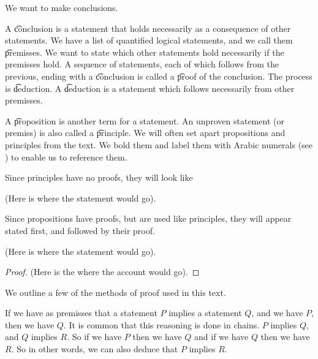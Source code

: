 

We want to make conclusions.


A \t{conclusion} is a statement that holds necessarily as a consequence of other statements.
We have a list of quantified logical statements, and we call them \t{premisses}.
We want to state which other statements hold necessarily if the premisses hold.
A sequence of statements, each of which follows from the previous, ending with a \t{conclusion} is called a \t{proof} of the conclusion.
The process is \t{deduction}.
A \t{deduction} is a statement which follows necessarily from other premisses.

A \t{proposition} is another term for a statement.
An unproven statement (or premiss) is also called a \t{principle}.
We will often set apart propositions and principles from the text.
We bold them and label them with Arabic numerals (see ) to enable us to reference them.


Since principles have no proofs, they will look like
\begin{principle}
  (Here is where the statement would go).
\end{principle}

Since propositions have proofs, but are used like principles, they will appear stated first, and followed by their proof.

\begin{proposition}
  (Here is where the statement would go).
  \begin{proof}
    (Here is the where the account would go).
  \end{proof}
\end{proposition}


We outline a few of the methods of proof used in this text.


If we have as premisses that a statement $P$ implies a statement $Q$, and we have $P$, then we have $Q$.
It is common that this reasoning is done in chains.
$P$ implies $Q$, and $Q$ implies $R$. So if we have $P$ then we have $Q$ and if we have $Q$ then we have $R$.
So in other words, we can also deduce that $P$ implies $R$.


